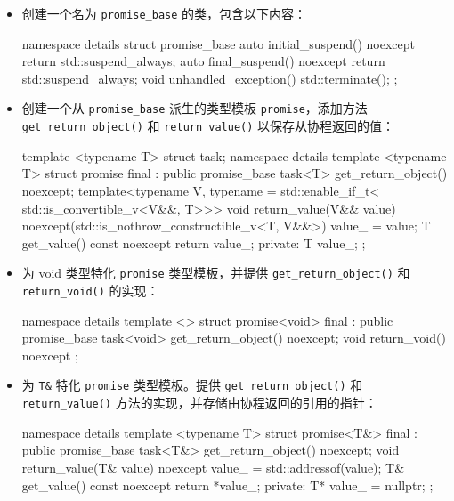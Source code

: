 \begin{itemize}
\item
创建一个名为 \verb|promise_base| 的类，包含以下内容：

\begin{cpp}
namespace details
{
    struct promise_base
    {
        auto initial_suspend() noexcept
        { return std::suspend_always{}; }
        auto final_suspend() noexcept
        { return std::suspend_always{}; }
        void unhandled_exception()
        { std::terminate(); }
    };
}
\end{cpp}

\item
创建一个从 \verb|promise_base| 派生的类型模板 \verb|promise|，添加方法 \verb|get_return_object()| 和 \verb|return_value()| 以保存从协程返回的值：

\begin{cpp}
template <typename T>
struct task;
namespace details
{
    template <typename T>
    struct promise final : public promise_base
    {
        task<T> get_return_object() noexcept;
        template<typename V,
                 typename = std::enable_if_t<
                    std::is_convertible_v<V&&, T>>>
        void return_value(V&& value)
        noexcept(std::is_nothrow_constructible_v<T, V&&>)
        {
            value_ = value;
        }
        T get_value() const noexcept { return value_; }
    private:
        T value_;
    };
}
\end{cpp}

\item
为 void 类型特化 \verb|promise| 类型模板，并提供 \verb|get_return_object()| 和 \verb|return_void()| 的实现：

\begin{cpp}
namespace details
{
    template <>
    struct promise<void> final : public promise_base
    {
        task<void> get_return_object() noexcept;
        void return_void() noexcept {}
    };
}
\end{cpp}

\item
为 \verb|T&| 特化 \verb|promise| 类型模板。提供 \verb|get_return_object()| 和 \verb|return_value()| 方法的实现，并存储由协程返回的引用的指针：

\begin{cpp}
namespace details
{
    template <typename T>
    struct promise<T&> final : public promise_base
    {
        task<T&> get_return_object() noexcept;
        void return_value(T& value) noexcept
        {
            value_ = std::addressof(value);
        }
        T& get_value() const noexcept { return *value_; }
        private:
        T* value_ = nullptr;
    };
}
\end{cpp}


\end{itemize}
